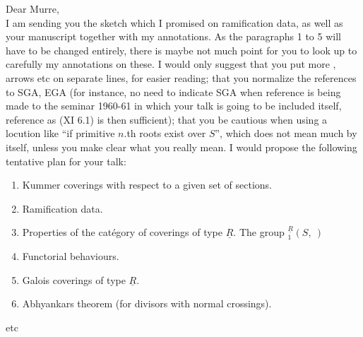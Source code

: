 Dear Murre,\\

I am sending you  the sketch which I promised on ramification data, as well as your manuscript together with my annotations. As the paragraphs 1 to 5 will have to be changed entirely, there is maybe not much point for you to look up to carefully my annotations on these.  I would only suggest that you put more , arrows etc on  separate lines, for easier reading; that you normalize the  references to SGA, EGA (for instance, no need to indicate SGA when reference is being made to the seminar 1960-61 in which your talk is going to be included itself, reference as (XI 6.1) is then sufficient); that you be cautious when using a locution like ``if primitive $n$.th roots exist over $S$'', which does not mean much by itself, unless you make clear what you really mean. I would propose the following tentative plan for your talk:

\begin{enumerate}[label={}]
\item[1.] Kummer coverings with respect to a given set of sections.
\item[2.] Ramification data.
\item[3.] Properties of the catégory of coverings of type $\underline{R}$. The group ${}_{1}^{\underline{R}}(S,\ )$
\item[4.] Functorial behaviours.
\item[5.] Galois coverings of type $\underline{R}$.
\item[6.] Abhyankars theorem (for divisors with normal crossings).
\end{enumerate}
etc

